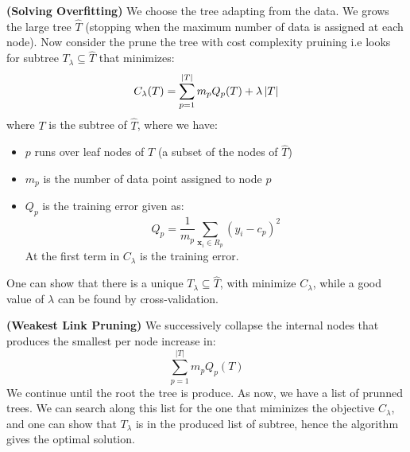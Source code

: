 \begin{remark}{\textbf{(Solving Overfitting)}}
    We choose the tree adapting from the data. We grows the large tree $\hat{T}$ (stopping when the maximum number of data is assigned at each node). Now consider the prune the tree with cost complexity pruining i.e looks for subtree $T_\lambda\subseteq \hat{T}$ that minimizes:
    \begin{equation*}
        C_\lambda(T) = \sum^{|T|}_{p=1} m_pQ_p(T) + \lambda\left| T \right|
    \end{equation*}
    where $T$ is the subtree of $\hat{T}$, where we have:
    \begin{itemize}
        \item $p$ runs over leaf nodes of $T$ (a subset of the nodes of $\hat{T}$)
        \item $m_p$ is the number of data point assigned to node $p$
        \item $Q_p$ is the training error given as:
        \begin{equation*}
            Q_p = \frac{1}{m_p}\sum_{\boldsymbol x_i \in R_p}(y_i - c_p)^2
        \end{equation*}
        At the first term in $C_\lambda$ is the training error. 
    \end{itemize}
    One can show that there is a unique $T_\lambda \subseteq \hat{T}$, with minimize $C_\lambda$, while a good value of $\lambda$ can be found by cross-validation. 
\end{remark}

\begin{definition}{\textbf{(Weakest Link Pruning)}}
    We successively collapse the internal nodes that produces the smallest per node increase in:
    \begin{equation*}
        \sum^{|T|}_{p=1} m_pQ_p(T)
    \end{equation*}
    We continue until the root the tree is produce. As now, we have a list of prunned trees. We can search along this list for the one that miminizes the objective $C_\lambda$, and one can show that $T_\lambda$ is in the produced list of subtree, hence the algorithm gives the optimal solution.
\end{definition}

